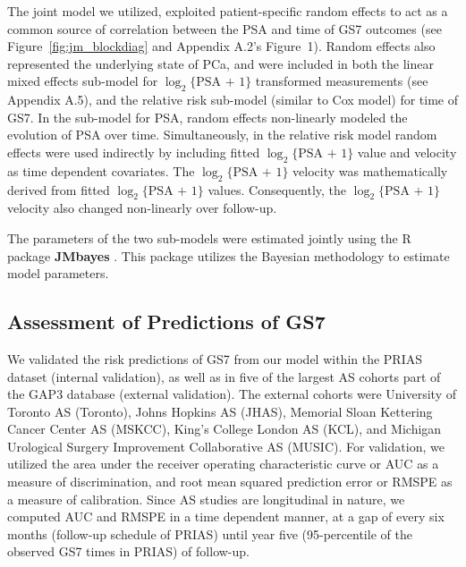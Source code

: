 The joint model we utilized, exploited patient-specific random effects \citep{laird1982random} to act as a common source of correlation between the PSA and time of GS7 outcomes (see Figure~\ref{fig:jm_blockdiag} and Appendix A.2's Figure~1). Random effects also represented the underlying state of PCa, and were included in both the linear mixed effects sub-model for $\log_2\{\mbox{PSA + 1}\}$ transformed measurements (see Appendix A.5), and the relative risk sub-model (similar to Cox model) for time of GS7. In the sub-model for PSA, random effects non-linearly modeled the evolution of PSA over time. Simultaneously, in the relative risk model random effects were used indirectly by including fitted $\log_2\{\mbox{PSA + 1}\}$ value and velocity as time dependent covariates. The $\log_2\{\mbox{PSA + 1}\}$ velocity was mathematically derived from fitted $\log_2\{\mbox{PSA + 1}\}$ values. Consequently, the $\log_2\{\mbox{PSA + 1}\}$ velocity also changed non-linearly over follow-up.

The parameters of the two sub-models were estimated jointly using the R package \textbf{JMbayes} \citep{rizopoulosJMbayes}. This package utilizes the Bayesian methodology to estimate model parameters.

\subsection{Assessment of Predictions of GS7}
We validated the risk predictions of GS7 from our model within the PRIAS dataset (internal validation), as well as in five of the largest AS cohorts part of the GAP3 database \citep{gap3_2018} (external validation). The external cohorts were University of Toronto AS (Toronto), Johns Hopkins AS (JHAS), Memorial Sloan Kettering Cancer Center AS (MSKCC), King's College London AS (KCL), and Michigan Urological Surgery Improvement Collaborative AS (MUSIC). For validation, we utilized the area under the receiver operating characteristic curve or AUC \cite{rizopoulos2017dynamic} as a measure of discrimination, and root mean squared prediction error or RMSPE \cite{rizopoulos2017dynamic} as a measure of calibration. Since AS studies are longitudinal in nature, we computed AUC and RMSPE in a time dependent manner, at a gap of every six months (follow-up schedule of PRIAS) until year five (95-percentile of the observed GS7 times in PRIAS) of follow-up.

